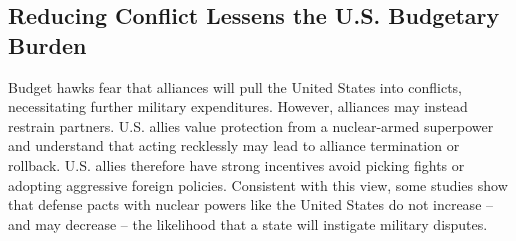 

\subsection*{Reducing Conflict Lessens the U.S. Budgetary Burden}

Budget hawks fear that alliances will pull the United States into conflicts, necessitating further military expenditures. However, alliances may instead restrain partners. U.S. allies value protection from a nuclear-armed superpower and understand that acting recklessly may lead to alliance termination or rollback. U.S. allies therefore have strong incentives avoid picking fights or adopting aggressive foreign policies. Consistent with this view, some studies show that defense pacts with nuclear powers like the United States do not increase -- and may decrease -- the likelihood that a state will instigate military disputes.\autocite{narangJCR19, fuhrmannnuclear14}


